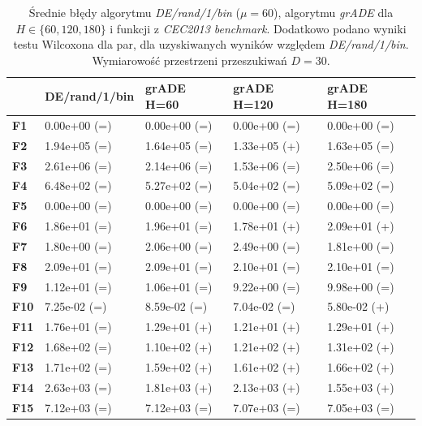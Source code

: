 \documentclass[12pt,a4paper]{report}
\begin{document}
{{{{{{{\begin{table}[h]
\centering
\caption{Średnie błędy algorytmu \emph{DE/rand/1/bin} ($\mu = 60$), algorytmu \emph{grADE} dla $H \in \{60, 120, 180\}$ i funkcji z \emph{CEC2013 benchmark}. Dodatkowo podano wyniki testu Wilcoxona dla par, dla uzyskiwanych wyników względem \emph{DE/rand/1/bin}. Wymiarowość przestrzeni przeszukiwań $D = 30$.}
\label{Anal17}
\begin{tabular}{|l|l|l|l|l|}
\hline
          & {\bf DE/rand/1/bin} & {\bf grADE H=60} & {\bf grADE H=120} & {\bf grADE H=180} \\ \hline
{\bf F1}  & 0.00e+00 (=)        & 0.00e+00 (=)     & 0.00e+00 (=)      & 0.00e+00 (=)      \\ \hline
{\bf F2}  & 1.94e+05 (=)        & 1.64e+05 (=)     & 1.33e+05 (+)      & 1.63e+05 (=)      \\ \hline
{\bf F3}  & 2.61e+06 (=)        & 2.14e+06 (=)     & 1.53e+06 (=)      & 2.50e+06 (=)      \\ \hline
{\bf F4}  & 6.48e+02 (=)        & 5.27e+02 (=)     & 5.04e+02 (=)      & 5.09e+02 (=)      \\ \hline
{\bf F5}  & 0.00e+00 (=)        & 0.00e+00 (=)     & 0.00e+00 (=)      & 0.00e+00 (=)      \\ \hline
{\bf F6}  & 1.86e+01 (=)        & 1.96e+01 (=)     & 1.78e+01 (+)      & 2.09e+01 (+)      \\ \hline
{\bf F7}  & 1.80e+00 (=)        & 2.06e+00 (=)     & 2.49e+00 (=)      & 1.81e+00 (=)      \\ \hline
{\bf F8}  & 2.09e+01 (=)        & 2.09e+01 (=)     & 2.10e+01 (=)      & 2.10e+01 (=)      \\ \hline
{\bf F9}  & 1.12e+01 (=)        & 1.06e+01 (=)     & 9.22e+00 (=)      & 9.98e+00 (=)      \\ \hline
{\bf F10} & 7.25e-02 (=)        & 8.59e-02 (=)     & 7.04e-02 (=)      & 5.80e-02 (+)      \\ \hline
{\bf F11} & 1.76e+01 (=)        & 1.29e+01 (+)     & 1.21e+01 (+)      & 1.29e+01 (+)      \\ \hline
{\bf F12} & 1.68e+02 (=)        & 1.10e+02 (+)     & 1.21e+02 (+)      & 1.31e+02 (+)      \\ \hline
{\bf F13} & 1.71e+02 (=)        & 1.59e+02 (+)     & 1.61e+02 (+)      & 1.66e+02 (+)      \\ \hline
{\bf F14} & 2.63e+03 (=)        & 1.81e+03 (+)     & 2.13e+03 (+)      & 1.55e+03 (+)      \\ \hline
{\bf F15} & 7.12e+03 (=)        & 7.12e+03 (=)     & 7.07e+03 (=)      & 7.05e+03 (=)      \\ \hline

\end{tabular}
\end{table}}}}}}}}
\end{document}

